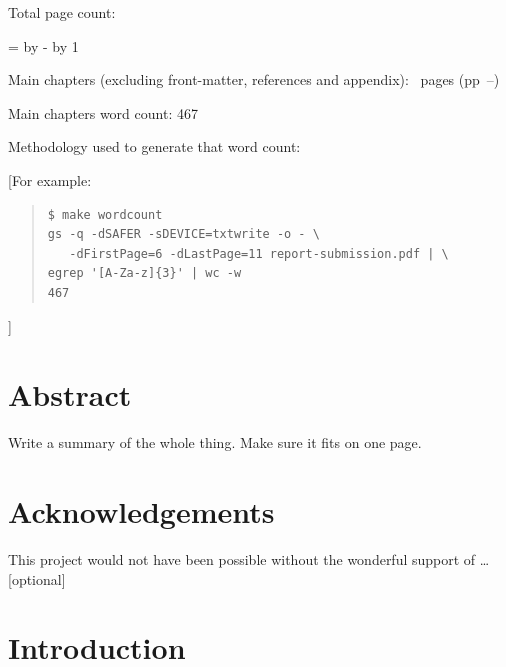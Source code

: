 \documentclass[12pt,a4paper,twoside]{report}
\newif\ifsubmission %
\begin{document}
\begin{sffamily}
Total page count: \pageref{lastpage}

\makeatletter
\@tempcnta=\relax%
\advance\@tempcnta by -%
\advance\@tempcnta by 1%
\xdef\contentpages{\the\@tempcnta}%
\makeatother

Main chapters (excluding front-matter, references and appendix):
\contentpages~pages
(pp~\pageref{firstcontentpage}--\pageref{lastcontentpage})

Main chapters word count: 467

Methodology used to generate that word count:

[For example:

\begin{quote}
\begin{verbatim}
$ make wordcount
gs -q -dSAFER -sDEVICE=txtwrite -o - \
   -dFirstPage=6 -dLastPage=11 report-submission.pdf | \
egrep '[A-Za-z]{3}' | wc -w
467
\end{verbatim}
\end{quote}

]

\end{sffamily}

\onehalfspacing

\chapter*{Abstract}

Write a summary of the whole thing. Make sure it fits on one page.

\ifsubmission\else

\chapter*{Acknowledgements}

This project would not have been possible without the wonderful
support of \ldots [optional]

\fi
\cleardoublepage %

\setcounter{tocdepth}{1} %
\tableofcontents

\chapter{Introduction}
\label{firstcontentpage} %
\label{chap:introduction}
\end{document}

